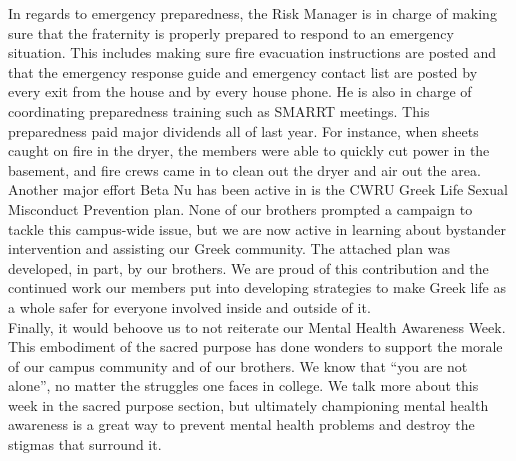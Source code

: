   In regards to emergency preparedness, the Risk Manager is in charge of making sure that the fraternity is properly prepared to respond to an emergency situation. This includes making sure fire evacuation instructions are posted and that the emergency response guide and emergency contact list are posted by every exit from the house and by every house phone. He is also in charge of coordinating preparedness training such as SMARRT meetings. This preparedness paid major dividends all of last year. For instance, when sheets caught on fire in the dryer, the members were able to quickly cut power in the basement, and fire crews came in to clean out the dryer and air out the area. \\
  
  Another major effort Beta Nu has been active in is the CWRU Greek Life Sexual Misconduct Prevention plan. None of our brothers prompted a campaign to tackle this campus-wide issue, but we are now active in learning about bystander intervention and assisting our Greek community. The attached plan was developed, in part, by our brothers. We are proud of this contribution and the continued work our members put into developing strategies to make Greek life as a whole safer for everyone involved inside and outside of it. \\

  Finally, it would behoove us to not reiterate our Mental Health Awareness Week. This embodiment of the sacred purpose has done wonders to support the morale of our campus community and of our brothers. We know that ``you are not alone'', no matter the struggles one faces in college. We talk more about this week in the sacred purpose section, but ultimately championing mental health awareness is a great way to prevent mental health problems and destroy the stigmas that surround it. \\
  